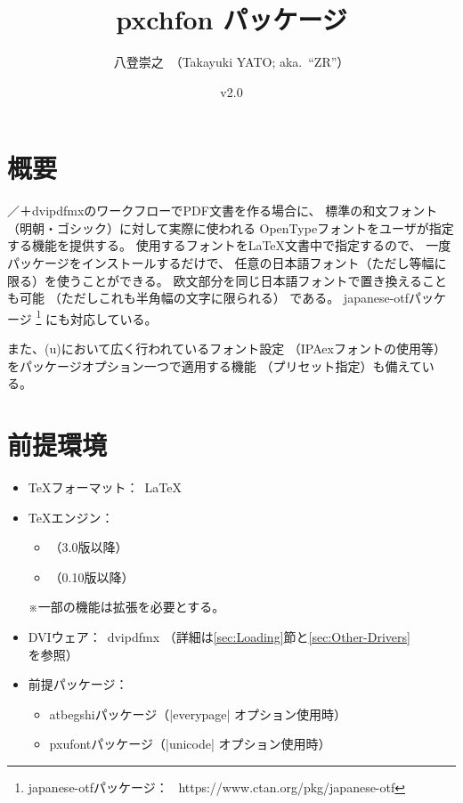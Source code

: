 \documentclass[uplatex,dvipdfmx,a4paper]{jsarticle}
\newcommand{\PkgVersion}{2.0}
\newcommand{\PkgDate}{2023/08/28}
\newcommand{\Pkg}[1]{\textsf{#1}}
\newcommand{\Note}{\par\noindent ※}
\newcommand{\Means}{：\ }
\begin{document}
\title{\Pkg{pxchfon} パッケージ}
\author{八登崇之\ （Takayuki YATO; aka.~``ZR''）}
\date{v\PkgVersion\quad[\PkgDate]}
\maketitle
\tableofcontents

\section{概要}
\label{sec:Introduction}

{\pLaTeX}／{\upLaTeX}＋dvipdfmxのワークフローでPDF文書を作る場合に、
標準の和文フォント（明朝・ゴシック）に対して実際に使われる
OpenTypeフォントをユーザが指定する機能を提供する。
使用するフォントを{\LaTeX}文書中で指定するので、
一度パッケージをインストールするだけで、
任意の日本語フォント（ただし等幅に限る）を使うことができる。
欧文部分を同じ日本語フォントで置き換えることも可能
（ただしこれも半角幅の文字に限られる）
である。
\Pkg{japanese-otf}パッケージ%
\footnote{\Pkg{japanese-otf}パッケージ\Means
  https://www.ctan.org/pkg/japanese-otf}%
にも対応している。

また、{(u)\pLaTeX}において広く行われているフォント設定
（IPAexフォントの使用等）をパッケージオプション一つで適用する機能
（プリセット指定）も備えている。

\section{前提環境}
\label{sec:Prerequisites}

\begin{itemize}
\item {\TeX}フォーマット\Means {\LaTeX}
\item {\TeX}エンジン\Means
  \begin{itemize}
  \item \pTeX（3.0版以降）
  \item \upTeX（0.10版以降）
  \end{itemize}
  \Note 一部の機能は{\eTeX}拡張を必要とする。
\item DVIウェア\Means dvipdfmx
  （詳細は\ref{sec:Loading}節と\ref{sec:Other-Drivers}を参照）
\item 前提パッケージ\Means
  \begin{itemize}
  \item \Pkg{atbegshi}パッケージ（|everypage| オプション使用時）
  \item \Pkg{pxufont}パッケージ（|unicode| オプション使用時）
  \end{itemize}
\end{itemize}
\end{document}
